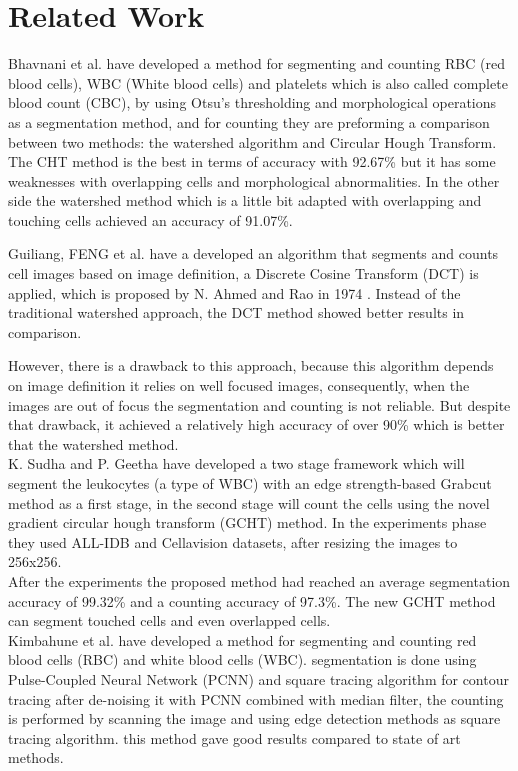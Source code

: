 \documentclass[conference]{IEEEtran}
\begin{document}
\section{Related Work}
Bhavnani et al. \cite{bhavnani2016segmentation} have developed a method for segmenting and counting RBC (red blood cells), WBC (White blood cells) and platelets which is also called complete blood count (CBC), by using Otsu’s thresholding and morphological operations as a segmentation method, and for counting they are preforming a comparison between two methods: the watershed algorithm and Circular Hough Transform. The CHT method is the best in terms of accuracy with 92.67\% but it has some weaknesses with overlapping cells and morphological abnormalities. In the other side the watershed method which is a little bit adapted with overlapping and touching cells achieved an accuracy of 91.07\%.\

Guiliang, FENG et al.\cite{guiliang2016microscopic} have a developed an algorithm that segments and counts cell images based on image definition, a Discrete Cosine Transform (DCT) is applied, which is proposed by N. Ahmed and Rao in 1974 \cite{ahmed1974discrete}. Instead of the traditional watershed approach, the DCT method showed better results in comparison.\

However, there is a drawback to this approach, because this algorithm depends on image definition it relies on well focused images, consequently, when the images are out of focus the segmentation and counting is not reliable. But despite that drawback, it achieved a relatively high accuracy of over 90\% which is better that the watershed method.\\

K. Sudha and P. Geetha \cite{SUDHA2020639} have developed a two stage framework which will segment the leukocytes (a type of WBC) with an edge strength-based Grabcut method as a first stage, in the second stage will count the cells using the novel gradient circular hough transform (GCHT) method. In the experiments phase they used ALL-IDB \cite{labati2011all} and Cellavision \cite{Zheng2018} datasets, after resizing the images to 256x256.\\
After the experiments the proposed method had reached an average segmentation accuracy of 99.32\% and a counting accuracy of 97.3\%. The new GCHT method can segment touched cells and even overlapped cells.\\

Kimbahune et al. \cite{kimbahune2011blood} have developed a method for segmenting and counting red blood cells (RBC) and white blood cells (WBC).
segmentation is done using Pulse-Coupled Neural Network (PCNN) and square tracing algorithm for contour tracing after de-noising it with PCNN combined with median filter, the counting is performed by scanning the image and using edge detection methods as square tracing algorithm. this method gave good results compared to state of art methods.\\
\end{document}
